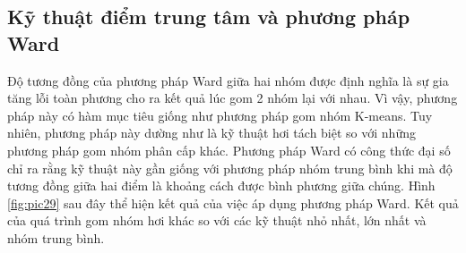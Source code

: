 \subsection{Kỹ thuật điểm trung tâm và phương pháp Ward}
Độ tương đồng của phương pháp Ward giữa hai nhóm được định nghĩa là sự gia tăng lỗi toàn phương cho ra kết quả lúc gom 2 nhóm lại với nhau.
Vì vậy, phương pháp này có hàm mục tiêu giống như phương pháp gom nhóm K-means.
Tuy nhiên, phương pháp này dường như là kỹ thuật hơi tách biệt so với những phương pháp gom nhóm phân cấp khác.
Phương pháp Ward có công thức đại số chỉ ra rằng kỹ thuật này gần giống với phương pháp nhóm trung bình khi mà độ tương đồng giữa hai điểm là khoảng cách được bình phương giữa chúng.
Hình \ref{fig:pic29} sau đây thể hiện kết quả của việc áp dụng phương pháp Ward. Kết quả của quá trình gom nhóm hơi khác so với các kỹ thuật nhỏ nhất, lớn nhất và nhóm trung bình.

